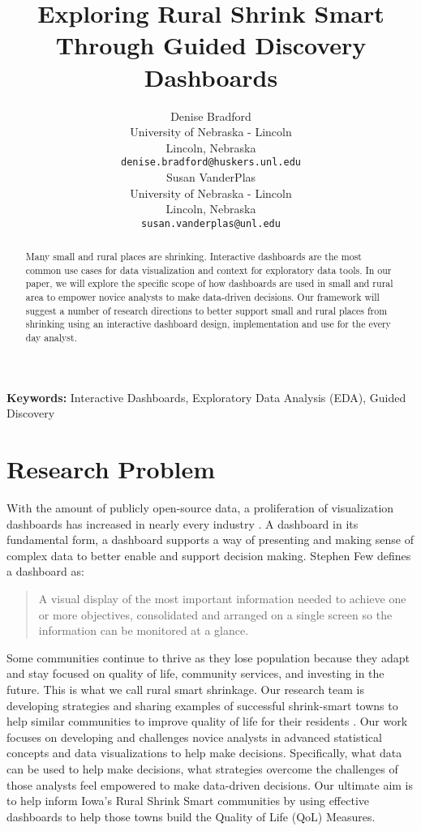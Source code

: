 \documentclass[10pt]{article}
\title{Exploring Rural Shrink Smart Through Guided Discovery Dashboards}
\author{
  Denise Bradford \\
  University of Nebraska - Lincoln \\
  Lincoln, Nebraska \\
  {\tt denise.bradford@huskers.unl.edu} \\\And
  Susan VanderPlas \\
  University of Nebraska - Lincoln \\
  Lincoln, Nebraska \\
  {\tt susan.vanderplas@unl.edu} \\}
\date{}
\begin{document}


\begin{Schunk}
\end{Schunk}


\maketitle
\begin{abstract}
Many small and rural places are shrinking. Interactive dashboards are the most common use cases for data visualization and context for exploratory data tools. In our paper, we will explore the specific scope of how dashboards are used in small and rural area to empower novice analysts to make data-driven decisions. Our framework will suggest a number of research directions to better support small and rural places from shrinking using an interactive dashboard design, implementation and use for the every day analyst. 
\end{abstract}

{\bf Keywords:} Interactive Dashboards, Exploratory Data Analysis (EDA), Guided Discovery

\section{Research Problem}
With the amount of publicly open-source data, a proliferation of visualization dashboards has increased in nearly every industry \cite{fisher}. A dashboard in its fundamental form, a dashboard supports a way of presenting and making sense of complex data to better enable and support decision making. Stephen Few defines a dashboard as:

\begin{quotation}
\small A visual display of the most important information needed to achieve one or more objectives, consolidated and arranged on a single screen so the information can be monitored at a glance. \cite{few}
\end{quotation}

Some communities continue to thrive as they lose population because they adapt and stay focused on quality of life, community services, and investing in the future. This is what we call rural smart shrinkage. Our research team is developing strategies and sharing examples of successful shrink-smart towns to help similar communities to improve quality of life for their residents \cite{scc}. Our work focuses on developing and challenges novice analysts in advanced statistical concepts and data visualizations to help make decisions. Specifically, what data can be used to help make decisions, what strategies overcome the challenges of those analysts feel empowered to make data-driven decisions. Our ultimate aim is to help inform Iowa's Rural Shrink Smart communities by using effective dashboards to help those towns build the Quality of Life (QoL) Measures.
\end{document}
